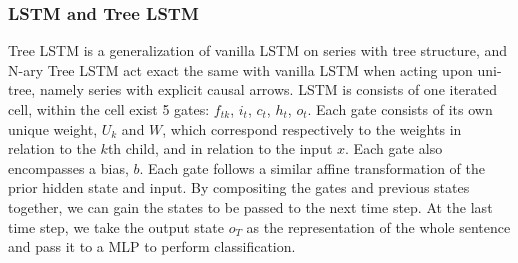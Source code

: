 \subsubsection{LSTM and Tree LSTM}
Tree LSTM is a generalization of vanilla LSTM on series with tree structure, and
N-ary Tree LSTM act exact the same with vanilla LSTM when acting upon uni-tree,
namely series with explicit causal arrows. LSTM is consists of one iterated
cell, within the cell exist 5 gates: $f_{tk}$, $i_t$, $c_t$, $h_t$, $o_t$. Each
gate consists of its own unique weight, $U_k$ and $W$, which correspond
respectively to the weights in relation to the $k$th child, and in relation to
the input $x$. Each gate also encompasses a bias, $b$. Each gate follows a
similar affine transformation of the prior hidden state and input. By
compositing the gates and previous states together, we can gain the states to be
passed to the next time step. At the last time step, we take the output state
$o_T$ as the representation of the whole sentence and pass it to a MLP to
perform classification.
\vspace{-8pt}

















